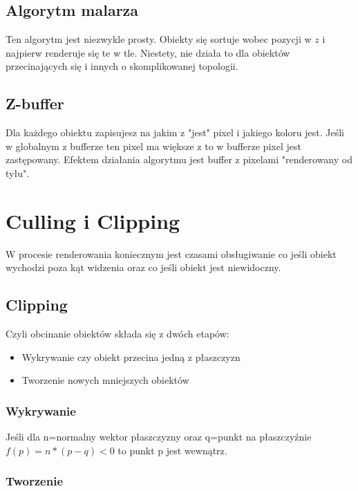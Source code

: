 \documentclass{../notatki}
\begin{document}
\subsection{Algorytm malarza}

Ten algorytm jest niezwykle prosty.
Obiekty się sortuje wobec pozycji w $z$ i najpierw renderuje się te w tle.
Niestety, nie działa to dla obiektów przecinających się i innych o skomplikowanej topologii.

\subsection{Z-buffer}

Dla każdego obiektu zapisujesz na jakim z "jest" pixel i jakiego koloru jest.
Jeśli w globalnym z bufferze ten pixel ma większe z to w bufferze pixel jest zastępowany.
Efektem działania algorytmu jest buffer z pixelami "renderowany od tyłu".

\section{Culling i Clipping}

W procesie renderowania koniecznym jest czasami obsługiwanie co jeśli obiekt wychodzi poza kąt widzenia oraz co jeśli obiekt jest niewidoczny.

\subsection{Clipping}

Czyli obcinanie obiektów składa się z dwóch etapów:

\begin{itemize}
    \item Wykrywanie czy obiekt przecina jedną z płaszczyzn
    \item Tworzenie nowych mniejszych obiektów
\end{itemize}

\subsubsection{Wykrywanie}

Jeśli dla n=normalny wektor płaszczyzny oraz q=punkt na płaszczyźnie $f(p) = n * (p - q) < 0$ to punkt p jest wewnątrz.

\subsubsection{Tworzenie}
\end{document}

